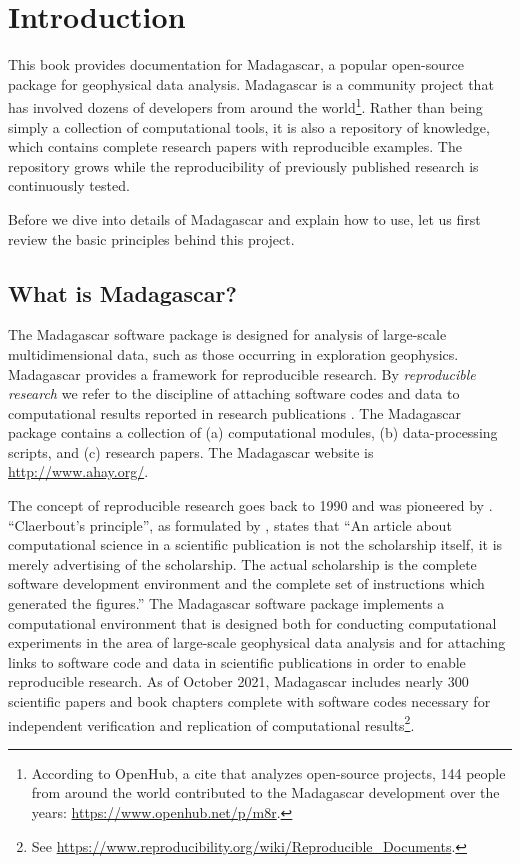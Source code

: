 \chapter{Introduction}

This book provides documentation for Madagascar, a popular open-source
package for geophysical data analysis. Madagascar is a community
project that has involved dozens of developers from around the
world\footnote{According to OpenHub, a cite that analyzes open-source
  projects, 144 people from around the world contributed to the
  Madagascar development over the years:
  \url{https://www.openhub.net/p/m8r}.}. Rather than being simply a
collection of computational tools, it is also a repository of
knowledge, which contains complete research papers with reproducible
examples. The repository grows while the reproducibility of previously
published research is continuously tested.

Before we dive into details of Madagascar and explain how to use, let
us first review the basic principles behind this project.

\section{What is Madagascar?}

The Madagascar software package is designed for analysis of
large-scale multidimensional data, such as those occurring in
exploration geophysics. Madagascar provides a framework for
reproducible research. By \emph{reproducible research} we refer to the
discipline of attaching software codes and data to computational
results reported in research publications \cite[]{fomel2008guest}. The
Madagascar package contains a collection of (a) computational modules,
(b) data-processing scripts, and (c) research papers. The Madagascar
website is \url{http://www.ahay.org/}.

The concept of reproducible research goes back to 1990 and was
pioneered by \cite{Claerbout.sep.67.139}. ``Claerbout's principle'',
as formulated by \cite{buckheit1995wavelab}, states that ``An article
about computational science in a scientific publication is not the
scholarship itself, it is merely advertising of the scholarship. The
actual scholarship is the complete software development environment
and the complete set of instructions which generated the figures.''
The Madagascar software package implements a computational environment
that is designed both for conducting computational experiments in the
area of large-scale geophysical data analysis and for attaching links
to software code and data in scientific publications in order to
enable reproducible research. As of October 2021, Madagascar includes
nearly 300 scientific papers and book chapters complete with software
codes necessary for independent verification and replication of
computational results\footnote{See
  \url{https://www.reproducibility.org/wiki/Reproducible_Documents}.}.

